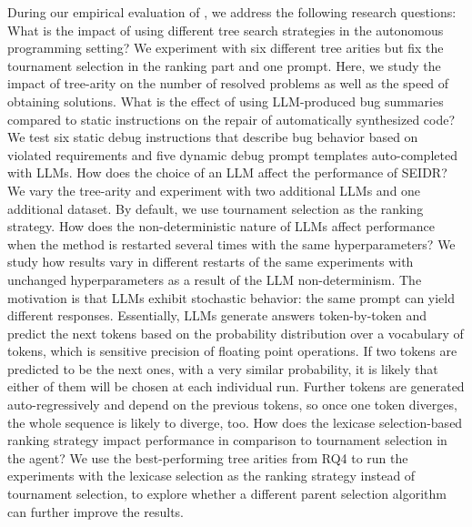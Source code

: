 During our empirical evaluation of \method{}, we address the following research questions:
What is the impact of using different tree search strategies
in the autonomous programming setting? 
We experiment with six different tree arities but fix the tournament selection in the ranking part and one prompt. 
Here, we study the impact of tree-arity on the number of resolved problems as well as the speed of obtaining solutions.   
 What is the effect of using LLM-produced bug summaries compared to static instructions on the repair of automatically synthesized code? We test six static debug instructions that describe bug behavior based on violated requirements and five dynamic debug prompt templates auto-completed with LLMs. 
How does the choice of an LLM affect the performance of SEIDR? 
We vary the tree-arity and experiment with two additional LLMs and one additional dataset.
By default, we use tournament selection as the ranking strategy. 
How does the non-deterministic nature of LLMs affect \method{} performance when the method is restarted several times with the same hyperparameters?
We study how \method{} results vary in different restarts of the same experiments with unchanged hyperparameters as a result of the LLM non-determinism. 
The motivation is that LLMs exhibit stochastic behavior: the same prompt can yield different responses. 
Essentially, LLMs generate answers token-by-token and predict the next tokens based on the probability distribution over a vocabulary of tokens, which is sensitive precision of floating point operations. 
If two tokens are predicted to be the next ones, with a very similar probability, it is likely that either of them will be chosen at each individual run. 
Further tokens are generated auto-regressively and depend on the previous tokens, so once one token diverges, the whole sequence is likely to diverge, too. 
How does the lexicase selection-based ranking strategy impact performance in comparison to tournament selection in the \rank{} agent? 
We use the best-performing tree arities from RQ4 to run the experiments with the lexicase selection as the ranking strategy instead of tournament selection, to explore whether a different parent selection algorithm can further improve the results.


